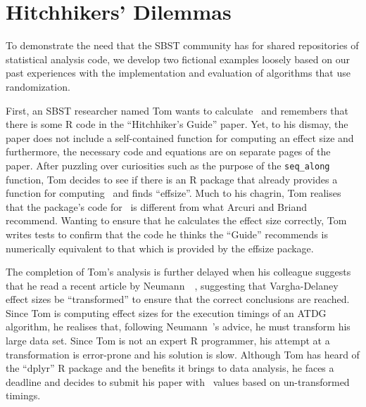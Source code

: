 
\vspace*{-1em}

\section{Hitchhikers' Dilemmas}
\label{sec:dilemma}

To demonstrate the need that the SBST community has for shared repositories of statistical analysis code, we develop two
fictional examples loosely based on our past experiences with the implementation and evaluation of algorithms that use
randomization.

First, an SBST researcher named Tom wants to calculate \atwelve~and remembers that there is some R code in the
``Hitchhiker's Guide'' paper. Yet, to his dismay, the paper does not include a self-contained function for computing an
effect size and furthermore, the necessary code and equations are on separate pages of the paper. After puzzling over
curiosities such as the purpose of the {\tt seq\_along} function, Tom decides to see if there is an R package that
already provides a function for computing \atwelve~and finds ``effsize''. Much to his chagrin, Tom realises that the
package's code for \atwelve~is different from what Arcuri and Briand recommend. Wanting to ensure that he calculates the
effect size correctly, Tom writes tests to confirm that the code he thinks the ``Guide'' recommends is numerically
equivalent to that which is provided by the effsize package.

The completion of Tom's analysis is further delayed when his colleague suggests that he read a recent article by
Neumann~\etal~\cite{Neumann2015}, suggesting that Vargha-Delaney effect sizes be ``transformed'' to ensure that the
correct conclusions are reached. Since Tom is computing effect sizes for the execution timings of an ATDG algorithm, he
realises that, following Neumann~\etal's advice, he must transform his large data set. Since Tom is not an expert R
programmer, his attempt at a transformation is error-prone and his solution is slow. Although Tom has heard of the
``dplyr'' R package and the benefits it brings to data analysis, he faces a deadline and decides to submit his paper
with \atwelve~values based on un-transformed timings.


